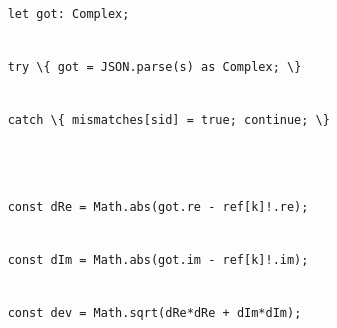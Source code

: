 \documentclass[
]{article}
\newcommand{\passthrough}[1]{#1}
\begin{document}
\strut \\
\passthrough{\lstinline!    !}\passthrough{\lstinline!let!}\passthrough{\lstinline! !}\passthrough{\lstinline!got:!}\passthrough{\lstinline! !}\passthrough{\lstinline!Complex;!}\strut \\
\passthrough{\lstinline!    !}\passthrough{\lstinline!try!}\passthrough{\lstinline! !}\passthrough{\lstinline!\{!}\passthrough{\lstinline! !}\passthrough{\lstinline!got!}\passthrough{\lstinline! !}\passthrough{\lstinline!=!}\passthrough{\lstinline! !}\passthrough{\lstinline!JSON.parse!}\passthrough{\lstinline!(s)!}\passthrough{\lstinline! !}\passthrough{\lstinline!as!}\passthrough{\lstinline! !}\passthrough{\lstinline!Complex;!}\passthrough{\lstinline! !}\passthrough{\lstinline!\}!}\strut \\
\passthrough{\lstinline!    !}\passthrough{\lstinline!catch!}\passthrough{\lstinline! !}\passthrough{\lstinline!\{!}\passthrough{\lstinline! !}\passthrough{\lstinline!mismatches[!}\passthrough{\lstinline!sid!}\passthrough{\lstinline!]!}\passthrough{\lstinline! !}\passthrough{\lstinline!=!}\passthrough{\lstinline! !}\passthrough{\lstinline!true;!}\passthrough{\lstinline! !}\passthrough{\lstinline!continue;!}\passthrough{\lstinline! !}\passthrough{\lstinline!\}!}\strut \\
\strut \\
\passthrough{\lstinline!    !}\passthrough{\lstinline!const!}\passthrough{\lstinline! !}\passthrough{\lstinline!dRe!}\passthrough{\lstinline! !}\passthrough{\lstinline!=!}\passthrough{\lstinline! !}\passthrough{\lstinline!Math.abs(got.re!}\passthrough{\lstinline! !}\passthrough{\lstinline!-!}\passthrough{\lstinline! !}\passthrough{\lstinline"ref[k]!.re);"}\strut \\
\passthrough{\lstinline!    !}\passthrough{\lstinline!const!}\passthrough{\lstinline! !}\passthrough{\lstinline!dIm!}\passthrough{\lstinline! !}\passthrough{\lstinline!=!}\passthrough{\lstinline! !}\passthrough{\lstinline!Math.abs(got.im!}\passthrough{\lstinline! !}\passthrough{\lstinline!-!}\passthrough{\lstinline! !}\passthrough{\lstinline"ref[k]!.im);"}\strut \\
\passthrough{\lstinline!    !}\passthrough{\lstinline!const!}\passthrough{\lstinline! !}\passthrough{\lstinline!dev!}\passthrough{\lstinline! !}\passthrough{\lstinline!=!}\passthrough{\lstinline! !}\passthrough{\lstinline!Math.sqrt!}\passthrough{\lstinline!(!}\passthrough{\lstinline!dRe!}\passthrough{\lstinline!*!}\passthrough{\lstinline!dRe!}\passthrough{\lstinline! !}\passthrough{\lstinline!+!}\passthrough{\lstinline! !}\passthrough{\lstinline!dIm!}\passthrough{\lstinline!*!}\passthrough{\lstinline!dIm!}\passthrough{\lstinline!);!}\strut \\
\end{document}
